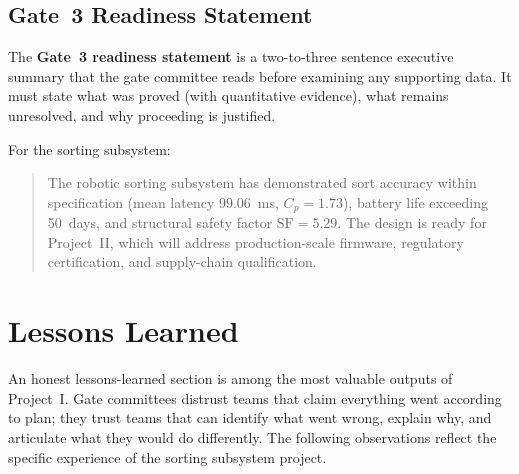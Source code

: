 \subsection{Gate~3 Readiness Statement}
\label{sec:ch17-readiness-statement}

The \textbf{Gate~3 readiness statement}
is a two-to-three sentence executive summary that the gate committee reads
before examining any supporting data.
It must state what was proved (with quantitative evidence), what remains
unresolved, and why proceeding is justified.

For the sorting subsystem:

\begin{quote}
  The robotic sorting subsystem has demonstrated sort accuracy within
  specification (mean latency 99.06~ms, $C_p = 1.73$), battery life
  exceeding 50~days, and structural safety factor $\text{SF} = 5.29$.
  The design is ready for Project~II, which will address
  production-scale firmware, regulatory certification, and supply-chain
  qualification.
\end{quote}

\section{Lessons Learned}
\label{sec:ch17-lessons}

An honest lessons-learned section is among the most valuable outputs of
Project~I.
Gate committees distrust teams that claim everything went according to plan;
they trust teams that can identify what went wrong, explain why, and
articulate what they would do differently.
The following observations reflect the specific experience of the sorting
subsystem project.

